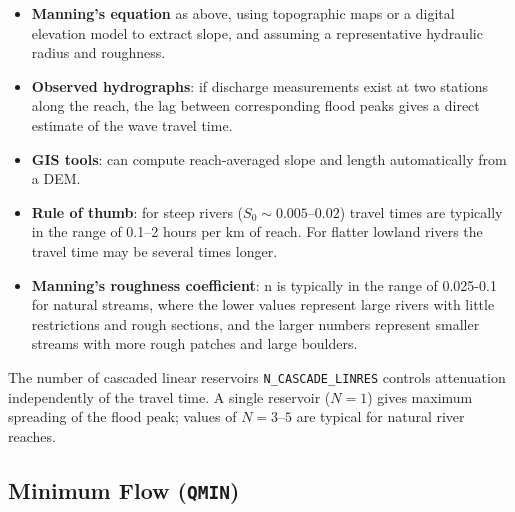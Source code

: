 \documentclass[a4paper, 12pt]{report}
\begin{document}
	\begin{itemize}
		\item \textbf{Manning's equation} as above, using topographic maps or a digital
		elevation model to extract slope, and assuming a representative hydraulic
		radius and roughness.
		
		\item \textbf{Observed hydrographs}: if discharge measurements exist at two
		stations along the reach, the lag between corresponding flood peaks gives a
		direct estimate of the wave travel time.
		
		\item \textbf{GIS tools}: can compute reach-averaged slope and length automatically from a DEM.
		
		\item \textbf{Rule of thumb}: for steep rivers ($S_0 \sim 0.005$--$0.02$)
		travel times are typically in the range of 0.1--2 hours per km of reach.
		For flatter lowland rivers the travel time may be several times longer.

        \item \textbf{Manning's roughness coefficient}: n is typically in the range of 0.025-0.1 for natural streams, where the lower values represent large rivers with little restrictions and rough sections, and the larger numbers represent smaller streams with more rough patches and large boulders.  
            
	\end{itemize}
	
	The number of cascaded linear reservoirs \texttt{N\_CASCADE\_LINRES} controls
	attenuation independently of the travel time. A single reservoir ($N=1$) gives
	maximum spreading of the flood peak; values of $N = 3$--$5$ are typical for
	natural river reaches.
	
	\subsection{Minimum Flow (\texttt{QMIN})}
\end{document}

